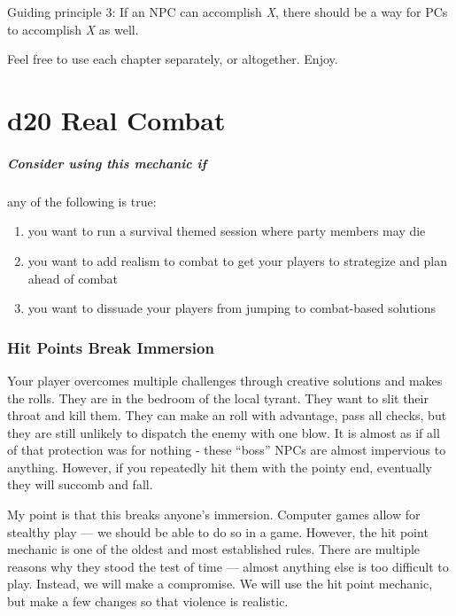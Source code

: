 \documentclass[twocolumn]{dndbook}
\begin{document}
\begin{emphasisParagraph}
	Guiding principle 3: If an NPC can accomplish \emph{X}, there should be a way for PCs to accomplish \emph{X} as well.
\end{emphasisParagraph}



Feel free to use each chapter separately, or altogether. Enjoy.




\chapter{d20 Real Combat}
\label{chap:d20_real_combat}

\begin{emphasisParagraph}
	\paragraph*{Consider using this mechanic if} any of the following is true:
	\begin{enumerate}
		\item you want to run a survival themed session where party members may die
		\item you want to add realism to combat to get your players to strategize and plan ahead of combat
		\item you want to dissuade your players from jumping to combat-based solutions
	\end{enumerate}
\end{emphasisParagraph}


\subsection{Hit Points Break Immersion}

Your player overcomes multiple challenges through creative solutions and makes the rolls.
They are in the bedroom of the local tyrant. They want to slit their throat and kill them.
They can make an roll with advantage, pass all checks, but they are still unlikely to dispatch the enemy with one blow.
It is almost as if all of that protection was for nothing - these ``boss'' NPCs are almost impervious to anything.
However, if you repeatedly hit them with the pointy end, eventually they will succomb and fall.\par

My point is that this breaks anyone's immersion.
Computer games allow for stealthy play --- we should be able to do so in a game.
However, the hit point mechanic is one of the oldest and most established rules.
There are multiple reasons why they stood the test of time --- almost anything else is too difficult to play.
Instead, we will make a compromise.
We will use the hit point mechanic, but make a few changes so that violence is realistic.
\end{document}
